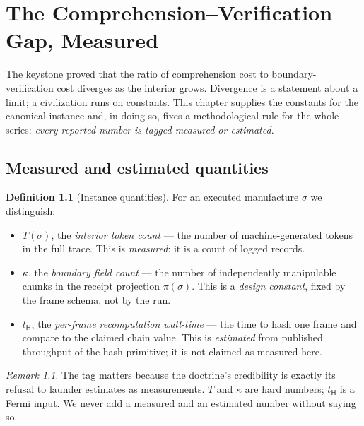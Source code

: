 \documentclass[11pt,oneside]{book}
\theoremstyle{definition}
\newtheorem{definition}{Definition}[chapter]
\theoremstyle{plain}
\theoremstyle{remark}
\newtheorem*{remark}{Remark}
\newcommand{\Proj}{\pi}                        %
\newcommand{\chainH}{\mathsf{H}}               %
\newcommand{\CL}{\kappa}                       %
\begin{document}
\chapter{The Comprehension--Verification Gap, Measured}
\label{ch:gap}

The keystone proved that the ratio of comprehension cost to boundary-verification cost diverges as the interior grows. %
Divergence is a statement about a limit; a civilization runs on constants. %
This chapter supplies the constants for the canonical instance and, in doing so, fixes a methodological rule for the whole series: \emph{every reported number is tagged measured or estimated}. %

\section{Measured and estimated quantities}

\begin{definition}[Instance quantities]\label{def:instance-q}
For an executed manufacture $\sigma$ we distinguish: %
\begin{itemize}[leftmargin=*]
\item $T(\sigma)$, the \emph{interior token count} --- the number of machine-generated tokens in the full trace. This is \emph{measured}: it is a count of logged records. %
\item $\CL$, the \emph{boundary field count} --- the number of independently manipulable chunks in the receipt projection $\Proj(\sigma)$. This is a \emph{design constant}, fixed by the frame schema, not by the run. %
\item $t_{\chainH}$, the \emph{per-frame recomputation wall-time} --- the time to hash one frame and compare to the claimed chain value. This is \emph{estimated} from published throughput of the hash primitive; it is not claimed as measured here. %
\end{itemize}
\end{definition}

\begin{remark}
The tag matters because the doctrine's credibility is exactly its refusal to launder estimates as measurements. %
$T$ and $\CL$ are hard numbers; $t_{\chainH}$ is a Fermi input. %
We never add a measured and an estimated number without saying so. %
\end{remark}
\end{document}
